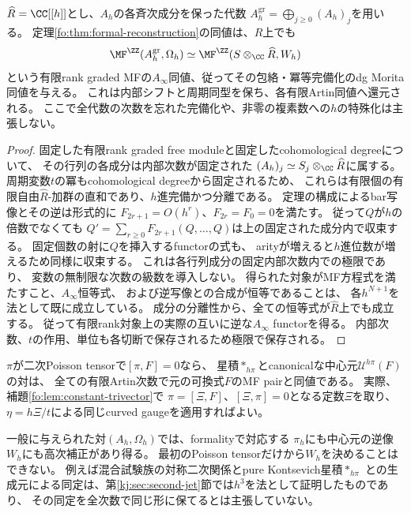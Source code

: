 \begin{corollary}[次数別完備基底上の有限rank比較]
\label{fo:cor:complete-graded}
$\widehat R=\CC[[h]]$とし、$A_h$の各斉次成分を保った代数
$A_h^{\mathrm{gr}}=\bigoplus_{j\ge0}(A_h)_j$を用いる。
定理\ref{fo:thm:formal-reconstruction}の同値は、$\widehat R$上でも
\[
 \MF^{\ZZ}(A_h^{\mathrm{gr}},\Omega_h)
 \simeq
 \MF^{\ZZ}(S\otimes_\CC\widehat R,W_h)
\]
という有限rank graded MFの$A_\infty$同値、従ってその包絡・冪等完備化のdg Morita同値を与える。
これは内部シフトと周期同型を保ち、各有限Artin同値へ還元される。
ここで全代数の次数を忘れた完備化や、非零の複素数への$h$の特殊化は主張しない。
\end{corollary}
\begin{proof}
固定した有限rank graded free moduleと固定したcohomological degreeについて、
その行列の各成分は内部次数が固定された
$(A_h)_j\simeq S_j\otimes_\CC\widehat R$に属する。
周期変数$t$の冪もcohomological degreeから固定されるため、
これらは有限個の有限自由$\widehat R$-加群の直和であり、$h$進完備かつ分離である。
定理の構成によるbar写像とその逆は形式的に
$F_{2r+1}=O(h^r)$、$F_{2r}=F_0=0$を満たす。
従って$Q$が$h$の倍数でなくても
$Q'=\sum_{r\ge0}F_{2r+1}(Q,\ldots,Q)$は上の固定された成分内で収束する。
固定個数の射に$Q$を挿入するfunctorの式も、
arityが増えると$h$進位数が増えるため同様に収束する。
これは各行列成分の固定内部次数内での極限であり、
変数の無制限な次数の級数を導入しない。
得られた対象がMF方程式を満たすこと、$A_\infty$恒等式、
および逆写像との合成が恒等であることは、
各$h^{N+1}$を法として既に成立している。
成分の分離性から、全ての恒等式が$\widehat R$上でも成立する。
従って有限rank対象上の実際の互いに逆な$A_\infty$ functorを得る。
内部次数、$t$の作用、単位も各切断で保存されるため極限で保存される。
\end{proof}

\begin{remark}
\label{fo:rem:canonical-center}
$\pi$が二次Poisson tensorで$[\pi,F]=0$なら、
星積$*_{h\pi}$とcanonicalな中心元$\mathcal U^{h\pi}(F)$の対は、
全ての有限Artin次数で元の可換式$F$のMF pairと同値である。
実際、補題\ref{fo:lem:constant-trivector}で
$\pi=[\Xi,F]$、$[\Xi,\pi]=0$となる定数$\Xi$を取り、
$\eta=h\Xi/t$による同じcurved gaugeを適用すればよい。

一般に与えられた対$(A_h,\Omega_h)$では、formalityで対応する
$\pi_h$にも中心元の逆像$W_h$にも高次補正があり得る。
最初のPoisson tensorだけから$W_h$を決めることはできない。
例えば混合試験族の対称二次関係とpure Kontsevich星積$*_{h\pi}$
との生成元による同定は、第\ref{kj:sec:second-jet}節では$h^3$を法として証明したものであり、
その同定を全次数で同じ形に保てるとは主張していない。
\end{remark}

